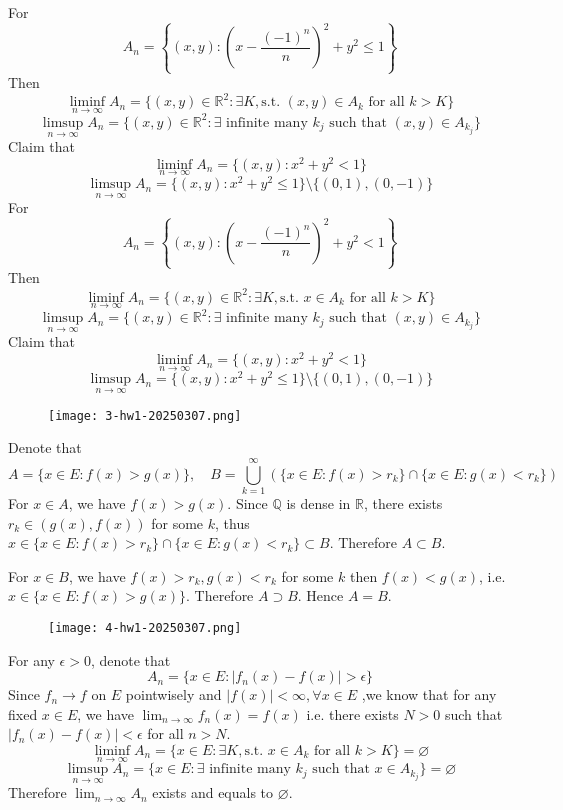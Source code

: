 For
\[
A_n=\left\{  (x,y):\left( x-\frac{(-1)^{n}}{n} \right)^{2}+y^{2}\leq   1  \right\}
\]
Then
\[
\liminf_{ n \to \infty }A_n=\{ (x,y)\in \mathbb{R}^{2}: \exists K,\text{s.t. }(x,y)\in A_k\text{ for all }k>K \}
\]
\[
\limsup_{ n \to \infty } A_n=\{(x,y)\in \mathbb{R}^{2}: \exists \text{ infinite many }k_j\text{ such that } (x,y)\in A_{k_j}\}
\]
Claim that
\[
\liminf_{ n \to \infty }A_n = \{ (x,y):x^{2}+y^{2}<1 \}
\]
\[
\limsup_{ n \to \infty } A_n=\{ (x, y):x^{2}+y^{2}\leq1 \}\setminus \{ (0,1),(0,-1) \}
\]
For
\[
A_n=\left\{  (x,y):\left( x-\frac{(-1)^{n}}{n} \right)^{2}+y^{2}<   1  \right\}
\]
Then
\[
\liminf_{ n \to \infty }A_n=\{ (x,y)\in \mathbb{R}^{2}: \exists K,\text{s.t. }x\in A_k\text{ for all }k>K \}
\]
\[
\limsup_{ n \to \infty } A_n=\{(x,y)\in \mathbb{R}^{2}: \exists \text{ infinite many }k_j\text{ such that } (x,y)\in A_{k_j}\}
\]
Claim that
\[
\liminf_{ n \to \infty }A_n = \{ (x,y):x^{2}+y^{2}<1 \}
\]
\[
\limsup_{ n \to \infty } A_n=\{ (x, y):x^{2}+y^{2}\leq1 \}\setminus \{ (0,1),(0,-1) \}
\]
\begin{figure}[H]
\centering
\texttt{[image: 3-hw1-20250307.png]}
\label{}
\end{figure}

Denote that
\[
A=\{ x\in E:f(x)>g(x) \},\quad B=\bigcup_{k=1}^{\infty} (\{ x\in E :f(x)>r_k\}\cap \{ x\in E:g(x)<r_k \})
\]
For $x\in A$, we have $f(x)>g(x)$. Since $\mathbb{Q}$ is dense in $\mathbb{R}$, there exists $r_k\in(g(x),f(x))$ for some $k$, thus $x\in \{ x\in E:f(x)>r_k \}\cap \{ x\in E :g(x)<r_k\}\subset B$. Therefore $A\subset B$.

For $x\in B$, we have $f(x)>r_k,g(x)<r_k$ for some $k$ then $f(x)<g(x)$, i.e. $x\in \{ x\in E:f(x)>g(x)\}$. Therefore $A\supset B$. Hence $A=B$.

\begin{figure}[H]
\centering
\texttt{[image: 4-hw1-20250307.png]}
\label{}
\end{figure}

For any $\epsilon>0$, denote that
\[
A_n=\{ x\in E:\lvert f_n(x)-f(x) \rvert >\epsilon \}
\]
Since $f_n\to f$ on $E$ pointwisely and $\lvert f (x) \rvert<\infty,\forall x\in E$ ,we know that for any fixed $x\in E$, we have $\lim_{ n \to \infty }f_n(x)=f(x)$ i.e. there exists $N>0$ such that $\lvert f_n(x)-f(x) \rvert<\epsilon$ for all $n>N$.
\[
\liminf_{ n \to \infty }A_n=\{ x\in E: \exists K,\text{s.t. }x\in A_k\text{ for all }k>K \}=\varnothing
\]
\[
\limsup_{ n \to \infty } A_n=\{x\in E: \exists \text{ infinite many }k_j\text{ such that } x\in A_{k_j}\}=\varnothing
\]
Therefore $\lim_{ n \to \infty }A_n$ exists and equals to $\varnothing$.

